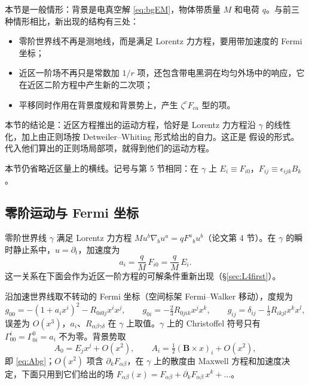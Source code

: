 \documentclass[11pt,a4paper]{ctexart}
\numberwithin{equation}{section}
\begin{document}
本节是一般情形：背景是电真空解 \eqref{eq:bgEM}，物体带质量 $M$ 和电荷 $q$。与前三种情形相比，新出现的结构有三处：
\begin{itemize}
\item 零阶世界线不再是测地线，而是满足 Lorentz 力方程，要用带加速度的 Fermi 坐标；
\item 近区一阶场不再只是常数加 $1/r$ 项，还包含带电黑洞在均匀外场中的响应，它在近区二阶方程中产生新的二次项；
\item 平移同时作用在背景度规和背景势上，产生 $\zeta^cF_{ca}$ 型的项。
\end{itemize}
本节的结论是：近区方程推出的运动方程，恰好是 Lorentz 力方程沿 $\gamma$ 的线性化，加上由正则场按 Detweiler--Whiting 形式给出的自力。这正是 \citet{ZimmermanPoisson2014} 假设的形式。代入他们算出的正则场局部项，就得到他们的运动方程。

本节仍省略近区量上的横线。记号与第 5 节相同：在 $\gamma$ 上 $E_i\equiv F_{i0}$，$F_{ij}\equiv\epsilon_{ijk}B_k$。

\subsection{零阶运动与 Fermi 坐标}
\label{sec:L4zeroth}

零阶世界线 $\gamma$ 满足 Lorentz 力方程 $Mu^b\nabla_bu^a=qF^a{}_bu^b$（论文第 4 节）。在 $\gamma$ 的瞬时静止系中，$u=\partial_t$，加速度为
\begin{equation}
a_i=\frac qM\,F_{i0}=\frac qM\,E_i .
\label{eq:balance}
\end{equation}
这一关系在下面会作为近区一阶方程的可解条件重新出现（\S\ref{sec:L4first}）。

沿加速世界线取不转动的 Fermi 坐标（空间标架 Fermi--Walker 移动），度规为 \citep{PoissonPoundVega2011}
\begin{equation}
g_{00}=-(1+a_ix^i)^2-R_{0i0j}x^ix^j,\qquad g_{0i}=-\tfrac23R_{0jik}x^jx^k,\qquad g_{ij}=\delta_{ij}-\tfrac13R_{ikjl}x^kx^l ,
\label{eq:fermiacc}
\end{equation}
误差为 $O(x^3)$，$a_i$、$R_{\alpha\beta\gamma\delta}$ 在 $\gamma$ 上取值。$\gamma$ 上的 Christoffel 符号只有 $\Gamma^i_{00}=\Gamma^0_{0i}=a_i$ 不为零。背景势取
\begin{equation}
A_0=E_jx^j+O(x^2),\qquad A_i=\tfrac12(\boldsymbol B\times x)_i+O(x^2),
\label{eq:Abg4}
\end{equation}
即 \eqref{eq:Abg}；$O(x^2)$ 项含 $\partial_kF_{\alpha\beta}$，在 $\gamma$ 上的散度由 Maxwell 方程和加速度决定，下面只用到它们给出的场 $F_{\alpha\beta}(x)=F_{\alpha\beta}+\partial_kF_{\alpha\beta}\,x^k+\dots$。
\end{document}
